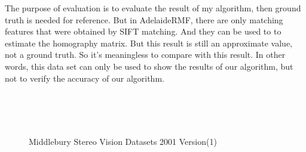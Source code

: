 The purpose of evaluation is to evaluate the result of my algorithm, then ground truth is needed for reference. But in AdelaideRMF, there are only matching features that were obtained by SIFT matching. And they can be used to to estimate the homography matrix. But this result is still an approximate value, not a ground truth. So it's meaningless to compare with this result. In other words, this data set can only be used to show the results of our algorithm, but not to verify the accuracy of our algorithm.
\begin{figure}[htbp]\centering
	 \\
	 \\
	\\		
	\caption{Middlebury Stereo Vision Datasets 2001 Version(1) \cite{scharsteinTaxonomyEvaluationDense2001}}
	\label{fig: Middlebury Stereo Vision Datasets 2001 Version(1)}
\end{figure}

